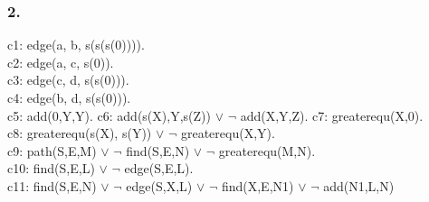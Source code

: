 \documentclass[10pt, a4paper]{article}
\begin{document}
\subsubsection{2.}

c1: edge(a, b, s(s(s(0)))).\\
c2: edge(a, c, s(0)).\\
c3: edge(c, d, s(s(0))).\\
c4: edge(b, d, s(s(0))).\\
c5: add(0,Y,Y).
c6: add(s(X),Y,s(Z)) $\vee$ $\neg$ add(X,Y,Z).
c7: greaterequ(X,0).\\
c8: greaterequ(s(X), s(Y)) $\vee$ $\neg$ greaterequ(X,Y).\\
c9: path(S,E,M) $\vee$ $\neg$ find(S,E,N) $\vee$ $\neg$ greaterequ(M,N).\\
c10: find(S,E,L) $\vee$ $\neg$ edge(S,E,L).\\
c11: find(S,E,N) $\vee$ $\neg$ edge(S,X,L) $\vee$ $\neg$ find(X,E,N1) $\vee$ $\neg$ add(N1,L,N)\\
\end{document}
